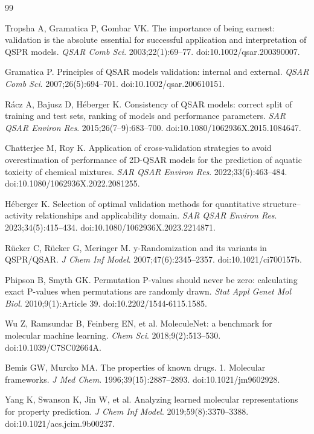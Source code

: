 \begin{thebibliography}{99}

Tropsha A, Gramatica P, Gombar VK. The importance of being earnest: validation is the absolute essential for successful application and interpretation of QSPR models. \textit{QSAR Comb Sci}. 2003;22(1):69--77. doi:10.1002/qsar.200390007.

Gramatica P. Principles of QSAR models validation: internal and external. \textit{QSAR Comb Sci}. 2007;26(5):694--701. doi:10.1002/qsar.200610151.

R\'acz A, Bajusz D, H\'eberger K. Consistency of QSAR models: correct split of training and test sets, ranking of models and performance parameters. \textit{SAR QSAR Environ Res}. 2015;26(7--9):683--700. doi:10.1080/1062936X.2015.1084647.

Chatterjee M, Roy K. Application of cross-validation strategies to avoid overestimation of performance of 2D-QSAR models for the prediction of aquatic toxicity of chemical mixtures. \textit{SAR QSAR Environ Res}. 2022;33(6):463--484. doi:10.1080/1062936X.2022.2081255.

H\'eberger K. Selection of optimal validation methods for quantitative structure--activity relationships and applicability domain. \textit{SAR QSAR Environ Res}. 2023;34(5):415--434. doi:10.1080/1062936X.2023.2214871.

R\"ucker C, R\"ucker G, Meringer M. y-Randomization and its variants in QSPR/QSAR. \textit{J Chem Inf Model}. 2007;47(6):2345--2357. doi:10.1021/ci700157b.

Phipson B, Smyth GK. Permutation P-values should never be zero: calculating exact P-values when permutations are randomly drawn. \textit{Stat Appl Genet Mol Biol}. 2010;9(1):Article 39. doi:10.2202/1544-6115.1585.

Wu Z, Ramsundar B, Feinberg EN, et al. MoleculeNet: a benchmark for molecular machine learning. \textit{Chem Sci}. 2018;9(2):513--530. doi:10.1039/C7SC02664A.

Bemis GW, Murcko MA. The properties of known drugs. 1. Molecular frameworks. \textit{J Med Chem}. 1996;39(15):2887--2893. doi:10.1021/jm9602928.

Yang K, Swanson K, Jin W, et al. Analyzing learned molecular representations for property prediction. \textit{J Chem Inf Model}. 2019;59(8):3370--3388. doi:10.1021/acs.jcim.9b00237.


\end{thebibliography}
